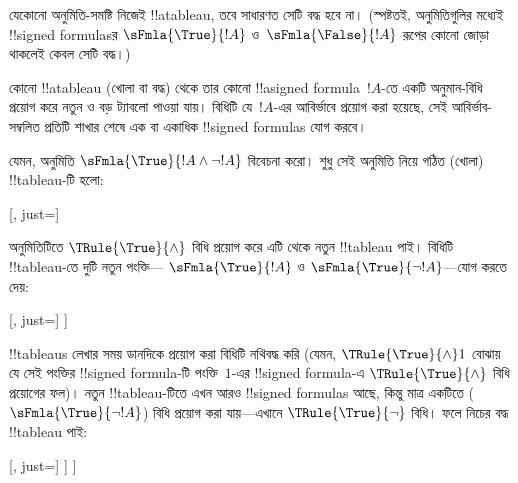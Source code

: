 \documentclass[../../../include/open-logic-section]{subfiles}
\begin{document}
\begin{ex}
  যেকোনো অনুমিতি-সমষ্টি নিজেই !!a{tableau}, তবে সাধারণত সেটি বদ্ধ
  হবে না। (স্পষ্টতই, অনুমিতিগুলির মধ্যেই !!{signed formula}sর
  $\sFmla{\True}{!A}$ ও~$\sFmla{\False}{!A}$ রূপের কোনো জোড়া
  থাকলেই কেবল সেটি বদ্ধ।)

  কোনো !!a{tableau} (খোলা বা বদ্ধ) থেকে তার কোনো
  !!a{signed formula}~$!A$-তে একটি অনুমান-বিধি প্রয়োগ করে নতুন ও
  বড় ট্যাবলো পাওয়া যায়। বিধিটি যে~$!A$-এর আবির্ভাবে প্রয়োগ
  করা হয়েছে, সেই আবির্ভাব-সম্বলিত প্রতিটি শাখার শেষে এক বা একাধিক
  !!{signed formula}s যোগ করবে।

  যেমন, অনুমিতি $\sFmla{\True}{!A \land \lnot !A}$ বিবেচনা করো।
  শুধু সেই অনুমিতি নিয়ে গঠিত (খোলা) !!{tableau}-টি হলো:
  \begin{center}
    \begin{tableau}{}
      [, just=\TAss]
    \end{tableau}{}
  \end{center}
  অনুমিতিটিতে $\TRule{\True}{\land}$ বিধি প্রয়োগ করে এটি থেকে নতুন
  !!{tableau} পাই। বিধিটি !!{tableau}-তে দুটি নতুন পংক্তি—
  $\sFmla{\True}{!A}$ ও $\sFmla{\True}{\lnot !A}$—যোগ করতে দেয়:
  \begin{center}
    \begin{tableau}{}
      [, just=\TAss
        [\sFmla{\True}{\formula{A}}, just={\TRule{\True}{\land}[1]},
          [\sFmla{\True}{\lnot \formula{A}}, just={\TRule{\True}{\land}[1]}
          ]
        ]
      ]
    \end{tableau}{}
  \end{center}
  !!{tableau}s লেখার সময় ডানদিকে প্রয়োগ করা বিধিটি নথিবদ্ধ করি
  (যেমন, $\TRule{\True}{\land} 1$ বোঝায় যে সেই পংক্তির
  !!{signed formula}-টি পংক্তি~$1$-এর !!{signed formula}-এ
  $\TRule{\True}{\land}$ বিধি প্রয়োগের ফল)। নতুন !!{tableau}-টিতে
  এখন আরও !!{signed formula}s আছে, কিন্তু মাত্র একটিতে
  ($\sFmla{\True}{\lnot !A}$) বিধি প্রয়োগ করা যায়—এখানে
  $\TRule{\True}{\lnot}$ বিধি। ফলে নিচের বদ্ধ !!{tableau} পাই:
  \begin{center}
    \begin{tableau}{}
      [, just=\TAss
        [\sFmla{\True}{\formula{A}}, just={\TRule{\True}{\land}[1]}
          [\sFmla{\True}{\lnot \formula{A}}, just={\TRule{\True}{\land}[1]}
            [\sFmla{\False}{\formula{A}}, just={\TRule{\True}{\lnot}[3]}, close]
          ]
        ]
      ]
    \end{tableau}{}
  \end{center}
\end{ex}
\end{document}
